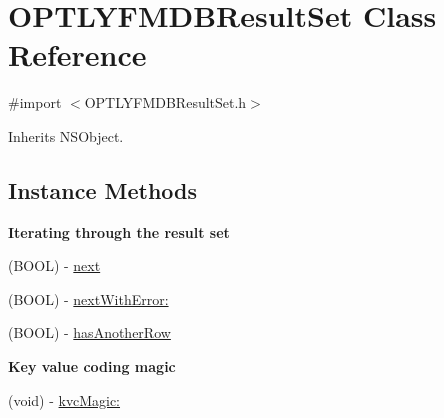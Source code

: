 \hypertarget{interface_o_p_t_l_y_f_m_d_b_result_set}{}\section{O\+P\+T\+L\+Y\+F\+M\+D\+B\+Result\+Set Class Reference}
\label{interface_o_p_t_l_y_f_m_d_b_result_set}


{\ttfamily \#import $<$O\+P\+T\+L\+Y\+F\+M\+D\+B\+Result\+Set.\+h$>$}



Inherits N\+S\+Object.

\subsection*{Instance Methods}
\begin{Indent}\textbf{ Iterating through the result set}\par
{\em 

 

 }\begin{DoxyCompactItemize}
\item 
(B\+O\+OL) -\/ \mbox{\hyperlink{interface_o_p_t_l_y_f_m_d_b_result_set_aed75988ef0079729eca9fcfdef92ec07}{next}}
\item 
(B\+O\+OL) -\/ \mbox{\hyperlink{interface_o_p_t_l_y_f_m_d_b_result_set_adf8089c880322493cc638aaa8f6ebb9b}{next\+With\+Error\+:}}
\item 
(B\+O\+OL) -\/ \mbox{\hyperlink{interface_o_p_t_l_y_f_m_d_b_result_set_aba289dd61c9163a368b2898ab3aea0ae}{has\+Another\+Row}}
\end{DoxyCompactItemize}
\end{Indent}
\begin{Indent}\textbf{ Key value coding magic}\par
{\em 

 

 }\begin{DoxyCompactItemize}
\item 
(void) -\/ \mbox{\hyperlink{interface_o_p_t_l_y_f_m_d_b_result_set_a2a8f33f21659c2f4594c4a8328baae55}{kvc\+Magic\+:}}
\end{DoxyCompactItemize}
\end{Indent}
